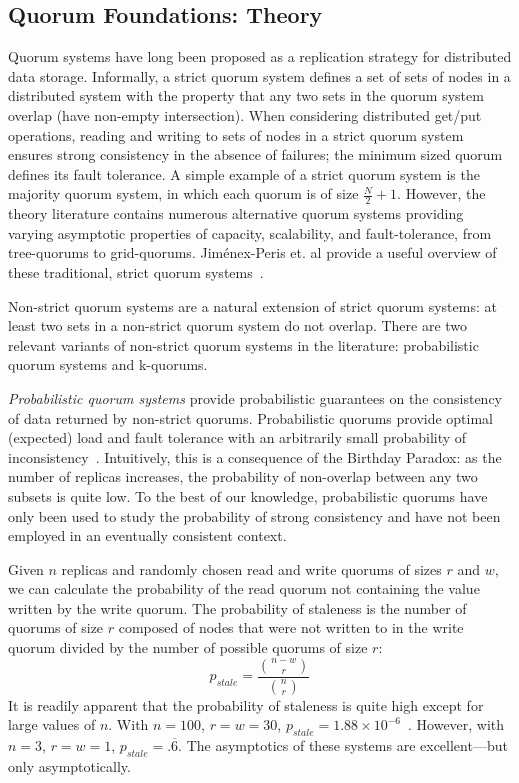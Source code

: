 \documentclass{vldb}
\begin{document}
\subsection{Quorum Foundations: Theory}

Quorum systems have long been proposed as a replication strategy for
distributed data storage.  Informally, a strict quorum system defines
a set of sets of nodes in a distributed system with the property that
any two sets in the quorum system overlap (have non-empty
intersection).  When considering distributed get/put operations,
reading and writing to sets of nodes in a strict quorum system ensures
strong consistency in the absence of failures; the minimum sized
quorum defines its fault tolerance.  A simple example of a strict
quorum system is the majority quorum system, in which each quorum is
of size $\frac{N}{2}+1$.  However, the theory literature contains
numerous alternative quorum systems providing varying asymptotic
properties of capacity, scalability, and fault-tolerance, from
tree-quorums to grid-quorums.  Jim\'{e}nex-Peris et. al provide a
useful overview of these traditional, strict quorum
systems~\cite{quorums-alternative}.

Non-strict quorum systems are a natural extension of strict quorum
systems: at least two sets in a non-strict quorum system do not
overlap.  There are two relevant variants of non-strict quorum systems in
the literature: probabilistic quorum systems and k-quorums.

\textit{Probabilistic quorum systems} provide probabilistic guarantees
on the consistency of data returned by non-strict quorums.
Probabilistic quorums provide optimal (expected) load and fault
tolerance with an arbitrarily small probability of
inconsistency~\cite{prob-quorum}.  Intuitively, this is a consequence
of the Birthday Paradox: as the number of replicas increases, the
probability of non-overlap between any two subsets is quite low.  To
the best of our knowledge, probabilistic quorums have only been used
to study the probability of strong consistency and have not been
employed in an eventually consistent context.

Given $n$ replicas and randomly chosen read and write quorums of sizes
$r$ and $w$, we can calculate the probability of the read quorum not
containing the value written by the write quorum.  The probability of
staleness is the number of quorums of size $r$ composed of nodes that
were not written to in the write quorum divided by the number of
possible quorums of size $r$:
\begin{equation}
\label{eq:prob-strict}
p_{stale}=\frac{{n-w \choose r}}{{n \choose r}}
\end{equation}
It is readily apparent that the probability of staleness is quite high
except for large values of $n$.  With $n=100$, $r=w=30$, $p_{stale} =
1.88 \times 10^{-6}$~\cite{nonstrict-availability}.  However, with
$n=3$, $r=w=1$, $p_{stale} = .\overline{6}$.  The asymptotics of these
systems are excellent---but only asymptotically.  
\end{document}

